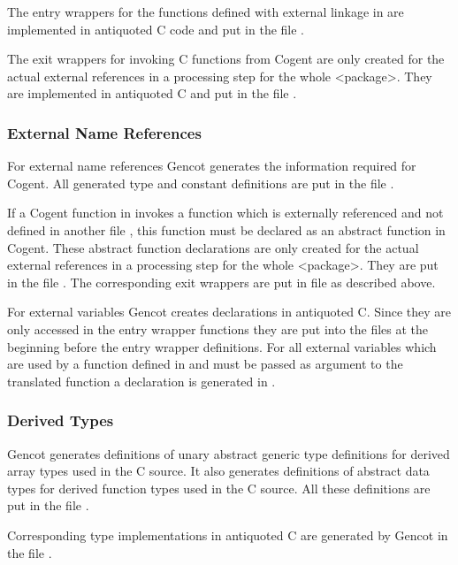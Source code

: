 The entry wrappers for the functions defined with external linkage in  are implemented in antiquoted C code and
put in the file . 

The exit wrappers for invoking C functions from Cogent are only created for the actual
external references in a processing step for the whole <package>. They are implemented in antiquoted C
and put in the file .

\subsubsection{External Name References}

For external name references Gencot generates the information required for Cogent. 
All generated type and constant definitions are put in the file .

If a Cogent function in  invokes a function which is externally referenced and not defined in another
file , this function must be declared as an abstract function in Cogent. These abstract function declarations
are only created for the actual
external references in a processing step for the whole <package>. They are put in the file .
The corresponding exit wrappers are put in file  as described above.

For external variables Gencot creates declarations in antiquoted C. Since they are only accessed in 
the entry wrapper functions they are put into the files  at the beginning before the entry wrapper 
definitions. For all
external variables which are used by a function defined in  and must be passed as argument to the 
translated function a declaration is generated in .

\subsubsection{Derived Types}

Gencot generates definitions of unary abstract generic type definitions for derived array types 
used in the C source. It also generates definitions of abstract data types for derived function types 
used in the C source. All these definitions are put in the file .

Corresponding type implementations in antiquoted C are generated by Gencot in the file .

